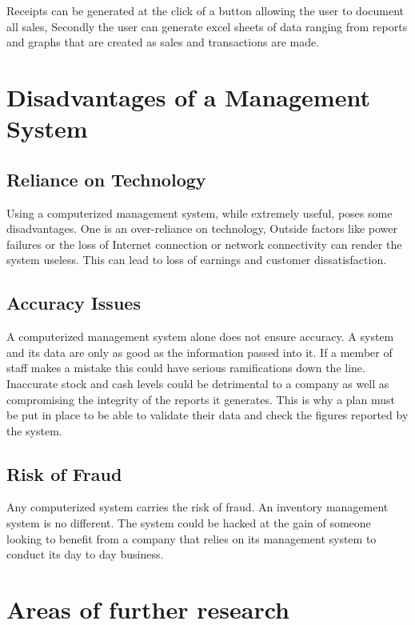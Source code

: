Receipts can be generated at the click of a button allowing the user to document all sales, Secondly the user can generate excel sheets of data ranging from reports and graphs that are created as sales and transactions are made.

\section{Disadvantages of a Management System} 

\subsection{Reliance on Technology}

Using a computerized management system, while extremely useful, poses some disadvantages. One is an over-reliance on technology, Outside factors like power failures or the loss of Internet connection or network connectivity can render the system useless. This can lead to loss of earnings and customer dissatisfaction.

\subsection{Accuracy Issues}

A computerized management system alone does not ensure accuracy. A system and its data are only as good as the information passed into it. If a member of staff makes a mistake this could have serious ramifications down the line. Inaccurate stock and cash levels could be detrimental to a company as well as compromising the integrity of the reports it generates. This is why a plan must be put in place to be able to validate their data and check the figures reported by the system.

\subsection{Risk of Fraud}

Any computerized system carries the risk of fraud. An inventory management system is no different. The system could be hacked at the gain of someone looking to benefit from a company that relies on its management system to conduct its day to day business.

\section{Areas of further research}

